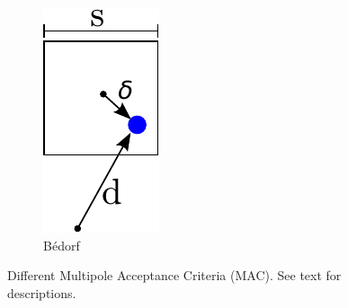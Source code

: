 \begin{figure}
    \hspace{0.75cm}
    \begin{subfigure}{0.15\columnwidth}
        \centering
        \includegraphics[width=\textwidth]{figures/mac_4}
        \caption{Bédorf\cite{Bedorf2012}}
        \label{fig:tree:mac:4}
    \end{subfigure}
\caption{Different Multipole Acceptance Criteria (MAC). See text for descriptions.}
\label{fig:tree:mac}
\end{figure}


